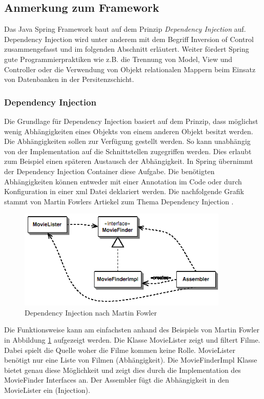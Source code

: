 \subsection{Anmerkung zum Framework}
Das Java Spring Framework baut auf dem Prinzip \textit{Dependency Injection} auf. Dependency Injection wird unter anderem mit dem Begriff Inversion of Control zusammengefasst und im folgenden Abschnitt erläutert. Weiter fördert Spring gute Programmierpraktiken wie z.B. die Trennung von Model, View und Controller oder die Verwendung von Objekt relationalen Mappern beim Einsatz von Datenbanken in der Persitenzschicht.

\subsubsection{Dependency Injection}
Die Grundlage für Dependency Injection basiert auf dem Prinzip, dass möglichst wenig Abhängigkeiten eines Objekts von einem anderen Objekt besitzt werden. Die Abhängigkeiten sollen zur Verfügung gestellt werden. So kann unabhängig von der Implementation auf die Schnittstellen zugegriffen werden. Dies erlaubt zum Beispiel einen späteren Austausch der Abhängigkeit. In Spring übernimmt der Dependency Injection Container diese Aufgabe. Die benötigten Abhängigkeiten können entweder mit einer Annotation im Code oder durch Konfiguration in einer xml Datei deklariert werden. Die nachfolgende Grafik stammt von Martin Fowlers Artiekel zum Thema Dependency Injection \cite{martinfowler2004}.
\begin{figure}[H]
	\centering
	\includegraphics[width=100mm]{images/tourliveweb/dependencyinjection.png}
	\caption{Dependency Injection nach Martin Fowler \cite{martinfowler2004}}
	\label{fig:dpendencyinjection}
\end{figure}
Die Funktionsweise kann am einfachsten anhand des Beispiels von Martin Fowler in Abbildung \ref{fig:dpendencyinjection} aufgezeigt werden. Die Klasse MovieLister zeigt und filtert Filme. Dabei spielt die Quelle woher die Filme kommen keine Rolle. MovieLister benötigt nur eine Liste von Filmen (Abhängigkeit). Die MovieFinderImpl Klasse bietet genau diese Möglichkeit und zeigt dies durch die Implementation des MovieFinder Interfaces an. Der Assembler fügt die Abhängigkeit in den MovieLister ein (Injection).
\\

